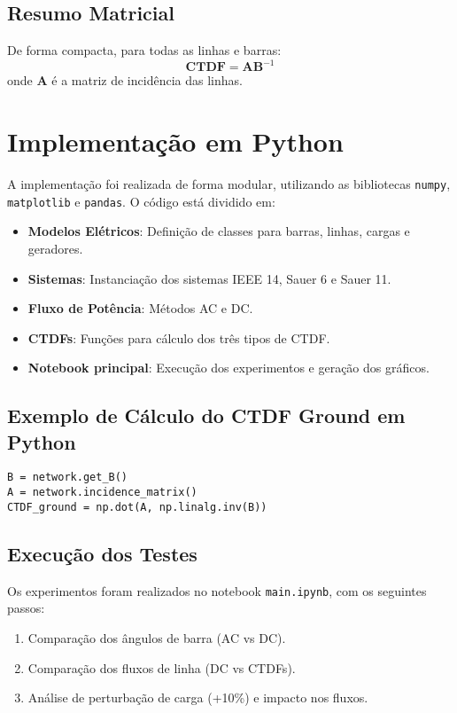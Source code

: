 \documentclass[journal]{IEEEtran}
\begin{document}
\subsection{Resumo Matricial}
De forma compacta, para todas as linhas e barras:
\begin{equation}
    \mathbf{CTDF} = \mathbf{A} \mathbf{B}^{-1}
\end{equation}
onde $\mathbf{A}$ é a matriz de incidência das linhas.

\section{Implementação em Python}

A implementação foi realizada de forma modular, utilizando as bibliotecas \texttt{numpy}, \texttt{matplotlib} e \texttt{pandas}. O código está dividido em:

\begin{itemize}
    \item \textbf{Modelos Elétricos}: Definição de classes para barras, linhas, cargas e geradores.
    \item \textbf{Sistemas}: Instanciação dos sistemas IEEE 14, Sauer 6 e Sauer 11.
    \item \textbf{Fluxo de Potência}: Métodos AC e DC.
    \item \textbf{CTDFs}: Funções para cálculo dos três tipos de CTDF.
    \item \textbf{Notebook principal}: Execução dos experimentos e geração dos gráficos.
\end{itemize}

\subsection{Exemplo de Cálculo do CTDF Ground em Python}
\begin{verbatim}
B = network.get_B()
A = network.incidence_matrix()
CTDF_ground = np.dot(A, np.linalg.inv(B))
\end{verbatim}

\subsection{Execução dos Testes}
Os experimentos foram realizados no notebook \texttt{main.ipynb}, com os seguintes passos:
\begin{enumerate}
    \item Comparação dos ângulos de barra (AC vs DC).
    \item Comparação dos fluxos de linha (DC vs CTDFs).
    \item Análise de perturbação de carga (+10\%) e impacto nos fluxos.
\end{enumerate}
\end{document}
